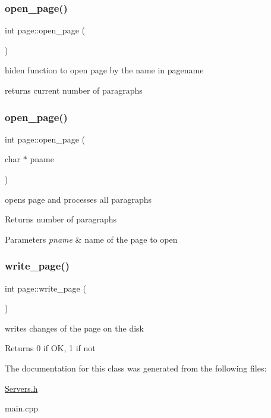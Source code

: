 \subsubsection{\texorpdfstring{open\+\_\+page()}{open\_page()}\hspace{0.1cm}{\footnotesize\ttfamily [1/2]}}
{\footnotesize\ttfamily int page\+::open\+\_\+page (\begin{DoxyParamCaption}{ }\end{DoxyParamCaption})\hspace{0.3cm}{\ttfamily [protected]}}



hiden function to open page by the name in pagename 

returns current number of paragraphs \mbox{\label{classpage_a5eae57fad910ef40d723c1808eeabad9}} 
\subsubsection{\texorpdfstring{open\+\_\+page()}{open\_page()}\hspace{0.1cm}{\footnotesize\ttfamily [2/2]}}
{\footnotesize\ttfamily int page\+::open\+\_\+page (\begin{DoxyParamCaption}\item[{char $\ast$}]{pname }\end{DoxyParamCaption})}

opens page and processes all paragraphs \begin{DoxyReturn}{Returns}
number of paragraphs 
\end{DoxyReturn}

\begin{DoxyParams}{Parameters}
{\em pname} & name of the page to open \\
\hline
\end{DoxyParams}
\mbox{\label{classpage_a5cbc74c74b3b2296bc76fe5496cff59f}} 
\subsubsection{\texorpdfstring{write\+\_\+page()}{write\_page()}}
{\footnotesize\ttfamily int page\+::write\+\_\+page (\begin{DoxyParamCaption}{ }\end{DoxyParamCaption})}

writes changes of the page on the disk \begin{DoxyReturn}{Returns}
0 if OK, 1 if not 
\end{DoxyReturn}


The documentation for this class was generated from the following files\+:\begin{DoxyCompactItemize}
\item 
\hyperlink{_servers_8h}{Servers.\+h}\item 
main.\+cpp\end{DoxyCompactItemize}
